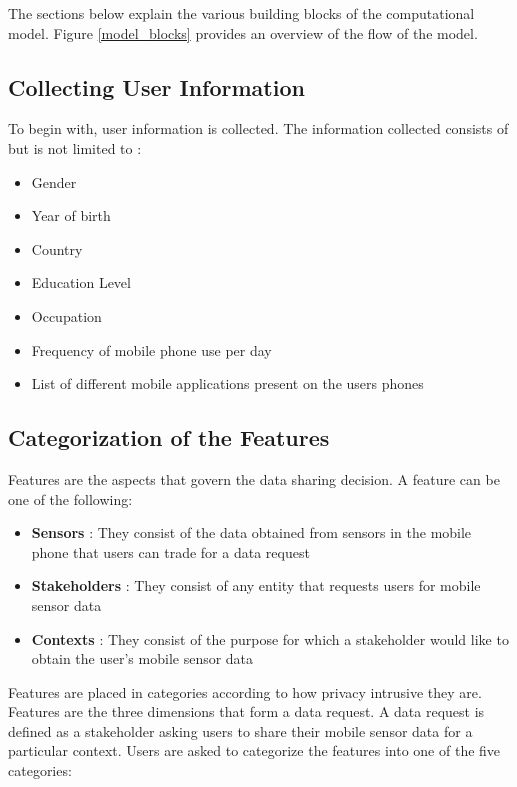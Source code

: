 The sections below explain the various building blocks of the computational model. Figure \ref{model_blocks}
provides an overview of the flow of the model.

\subsection{Collecting User Information}
To begin with, user information is collected. The information collected consists of but is not limited to :

\begin{itemize}
\item Gender
\item Year of birth
\item Country
\item Education Level
\item Occupation
\item Frequency of mobile phone use per day
\item List of different mobile applications present on the users phones
\end{itemize}

\subsection{Categorization of the Features} \label{catfeatures}

Features are the aspects that govern the data sharing decision. A feature can be one of the following:
\begin{itemize}
\item \textbf{Sensors} : They consist of the data obtained from sensors in the mobile phone that users can trade for a data request
\item \textbf{Stakeholders} : They consist of any entity that requests users for mobile sensor data
\item \textbf{Contexts} : They consist of the purpose for which a stakeholder would like to obtain the user's mobile sensor data
\end{itemize}

Features are placed in categories according to how privacy intrusive they are. Features are the three dimensions that form a data request. A data request is defined as a stakeholder asking users to share their mobile sensor data for a particular context. Users are asked to categorize the features into one of the five categories:

